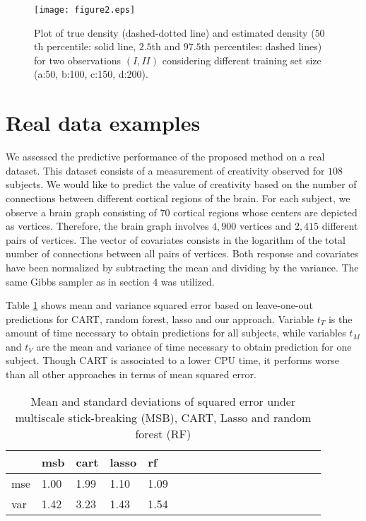 \documentclass{article}
\begin{document}
\begin{figure}
\centering
\texttt{[image: figure2.eps]}
\caption{Plot of true density (dashed-dotted line) and estimated density ($50$th percentile: solid line, $2.5$th and $97.5$th percentiles: dashed lines) for two observations $(I, II)$ considering different training set size (a:50, b:100, c:150, d:200). } \label{plotDensity}
\end{figure}


\section{Real data examples}

We assessed the predictive performance of the proposed method on a real dataset. This dataset consists of a measurement of creativity observed for $108$ subjects. We would like to predict the value of creativity based on the number of connections between different cortical regions of the brain. For each subject, we observe a brain graph consisting of $70$ cortical regions whose centers are depicted as vertices. Therefore, the brain graph involves $4,900$ vertices and $2,415$ different pairs of vertices. The vector of covariates consists in the logarithm of the total number of connections between all pairs of vertices. Both response and covariates have been normalized by subtracting the mean and dividing by the variance. The same Gibbs sampler as in section 4 was  utilized.

Table \ref{table3} shows mean and variance squared error based on leave-one-out predictions for CART, random forest, lasso and our approach. Variable $t_{T}$ is the amount of time necessary to obtain predictions for all subjects, while variables $t_M$ and $t_V$ are the mean and variance of time necessary to obtain prediction for one subject. Though CART is associated to a lower CPU time, it performs worse than all other approaches in terms of mean squared error. 


\begin{table}[t]
\caption{Mean and standard deviations of squared error under multiscale stick-breaking (MSB), CART, Lasso and random forest (RF)}
\label{table3} \vskip 0.15in \begin{center} \begin{small} \begin{sc}
\begin{tabular}{llllllllllllllllll}
\hline
\abovespace\belowspace
&msb&cart & lasso & rf\\
\hline
mse&   1.00 & 1.99 &1.10 & 1.09\\
 var& 1.42  & 3.23& 1.43& 1.54\\

\end{tabular}
\end{sc}
\end{small}
\end{center}
\vskip -0.1in
\end{table}


\newpage
\nocite{langley00}



\end{document}
